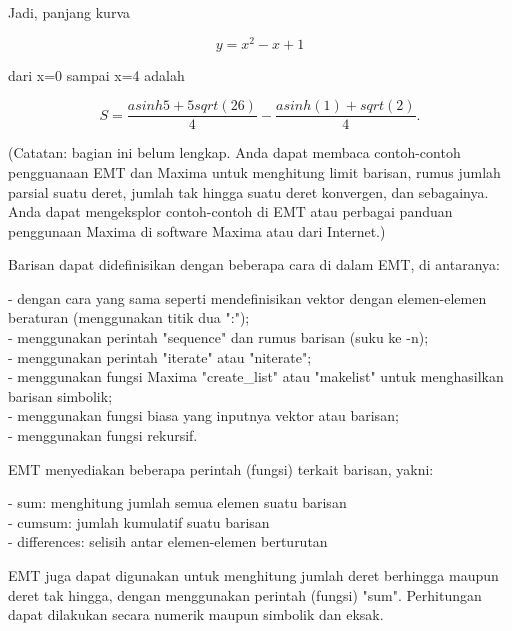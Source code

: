 \documentclass[a4paper,10pt]{article}
\begin{document}
\begin{eulernotebook}
\begin{eulercomment}
\begin{eulercomment}
\begin{eulerformula}
\[\]
\end{eulerformula}
\begin{eulercomment}
Jadi, panjang kurva\\
\end{eulercomment}
\begin{eulerformula}
\[
\text{$y=x^2-x+1$}
\]
\end{eulerformula}
\begin{eulercomment}
dari x=0 sampai x=4 adalah\\
\end{eulercomment}
\begin{eulerformula}
\[
\text{$S=\frac{asinh 5+5sqrt(26)}{4}-\frac{asinh(1)+sqrt(2)}{4}$}.
\]
\end{eulerformula}
\begin{eulercomment}
\begin{eulercomment}
\begin{eulercomment}
(Catatan: bagian ini belum lengkap. Anda dapat membaca contoh-contoh
pengguanaan EMT dan Maxima untuk menghitung limit barisan, rumus
jumlah parsial suatu deret, jumlah tak hingga suatu deret konvergen,
dan sebagainya. Anda dapat mengeksplor contoh-contoh di EMT atau
perbagai panduan penggunaan Maxima di software Maxima atau dari
Internet.)

Barisan dapat didefinisikan dengan beberapa cara di dalam EMT, di
antaranya:

- dengan cara yang sama seperti mendefinisikan vektor dengan
elemen-elemen beraturan (menggunakan titik dua ":");\\
- menggunakan perintah "sequence" dan rumus barisan (suku ke -n);\\
- menggunakan perintah "iterate" atau "niterate";\\
- menggunakan fungsi Maxima "create\_list" atau "makelist" untuk
menghasilkan barisan simbolik;\\
- menggunakan fungsi biasa yang inputnya vektor atau barisan;\\
- menggunakan fungsi rekursif.

EMT menyediakan beberapa perintah (fungsi) terkait barisan, yakni:

- sum: menghitung jumlah semua elemen suatu barisan\\
- cumsum: jumlah kumulatif suatu barisan\\
- differences: selisih antar elemen-elemen berturutan

EMT juga dapat digunakan untuk menghitung jumlah deret berhingga
maupun deret tak hingga, dengan menggunakan perintah (fungsi) "sum".
Perhitungan dapat dilakukan secara numerik maupun simbolik dan eksak.


\end{eulercomment}
\end{eulercomment}
\end{eulercomment}
\end{eulercomment}
\end{eulercomment}
\end{eulernotebook}
\end{document}
